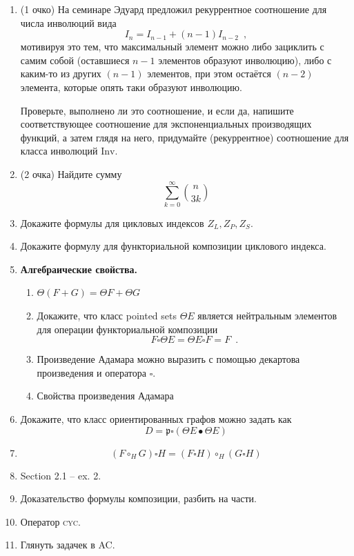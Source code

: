 \documentclass{article}
\theoremstyle{definition}
\begin{document}
\begin{enumerate}
	\item(1 очко) На семинаре Эдуард предложил рекуррентное 
	соотношение для числа инволюций вида
	\[
		I_{n} = I_{n-1} + (n-1)I_{n-2} \enspace ,
	\]
	мотивируя это тем, 
	что 
	максимальный элемент можно либо зациклить с самим собой (оставшиеся \( n-1 
	\) 
	элементов образуют инволюцию), либо с каким-то из других \( (n-1) \) 
	элементов, 
	при этом остаётся \( (n-2) \) элемента, которые опять таки образуют 
	инволюцию.
	
	Проверьте, выполнено ли это соотношение, и если да, напишите 
	соответствующее 
	соотношение для экспоненциальных производящих функций, а затем глядя на 
	него, 
	придумайте (рекуррентное) соотношение для класса инволюций \( \mathrm{Inv} 
	\).
    \item(2 очка) Найдите сумму 
    \[
        \sum_{k = 0}^{\infty} {n \choose 3k}
    \]

	\item Докажите формулы для цикловых индексов \( Z_L, Z_P, Z_S \).
	\item Докажите формулу для функториальной композиции циклового индекса.
	\item \textbf{Алгебраические свойства.}
	\begin{enumerate}
	\item \( \Theta(F + G) = \Theta F + \Theta G \)
	\item	Докажите, что класс pointed sets \( \Theta E \) является 
	нейтральным элементов для операции функториальной композиции
	\[
		F \square \Theta E = \Theta E \square F = F \enspace .
	\]
	\item Произведение Адамара можно выразить с помощью декартова произведения 
	и оператора \( \square \).
	\item Свойства произведения Адамара
	\end{enumerate}
	\item Докажите, что класс ориентированных графов можно задать как 
	\[
		D = \mathfrak p \square (\Theta E \bullet \Theta E)
	\]
    \item 
\[
	(F \circ_{H} G) \square H = (F \square H) \circ_{H} (G \square H)
\]
	\item Section 2.1 -- ex. 2. 
	\item Доказательство формулы композиции, разбить на части.
	\item Оператор \textsc{cyc}.
	\item Глянуть задачек в AC.
\end{enumerate}

\footnotesize


    
\end{document}
